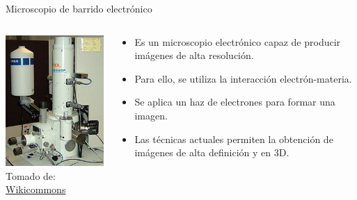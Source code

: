 \documentclass[aspectratio=169]{beamer}
\begin{document}
\begin{frame}{Microscopio de barrido electrónico}
    \begin{columns}[c, onlytextwidth]
    \begin{column}{0.45\textwidth}
            \centering
            \includegraphics[width = 0.7\linewidth]{fig/Optica/microscopio.jpg}\\
            \tiny{Tomado de: \href{https://es.wikipedia.org/wiki/Microscopio_electrónico_de_barrido}{Wikicommons}}
        \end{column}
        \begin{column}{0.55\textwidth}
            \begin{itemize}
                \item Es un microscopio electrónico capaz de producir imágenes de alta resolución.
                \item Para ello, se utiliza la interacción electrón-materia.
                \item Se aplica un haz de electrones para formar una imagen.
                \item Las técnicas actuales permiten la obtención de imágenes de alta definición y en 3D.
            \end{itemize}
        \end{column}
    \end{columns}
\end{frame}
\end{document}

